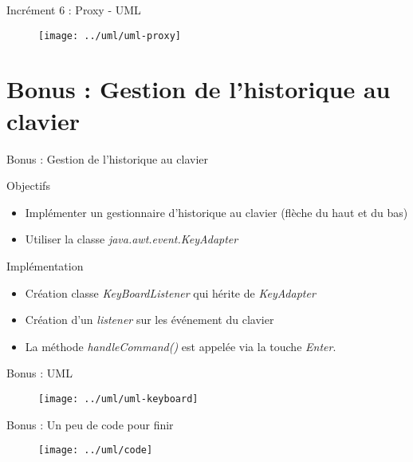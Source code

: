 \documentclass[utf8, 14pt]{beamer}
\begin{document}
	\begin{frame}{Incrément 6 : Proxy - UML}
		\begin{figure}[!h]
		\centering
		\texttt{[image: ../uml/uml-proxy]}
		\end{figure}		
	\end{frame}

	\section{Bonus : Gestion de l'historique au clavier}
	
	\begin{frame}{Bonus : Gestion de l'historique au clavier}
		\begin{block}{Objectifs}
		\begin{itemize}
		\item Implémenter un gestionnaire d’historique au clavier (flèche du haut et du bas)
		\item Utiliser la classe \emph{java.awt.event.KeyAdapter}
		\end{itemize}
		\end{block}
		
		\begin{exampleblock}{Implémentation}
		\begin{itemize}
		\item Création classe \emph{KeyBoardListener} qui hérite de \emph{KeyAdapter}
		\item Création d'un \emph{listener} sur les événement du clavier
		\item La méthode \emph{handleCommand()} est appelée via la touche \emph{Enter}.
		\end{itemize}
		\end{exampleblock}					
	\end{frame}

	\begin{frame}{Bonus : UML}
		\begin{figure}[!h]
		\centering
		\texttt{[image: ../uml/uml-keyboard]}
		\end{figure}		
	\end{frame}

	\begin{frame}{Bonus : Un peu de code pour finir}
		\begin{figure}[!h]
		\centering
		\texttt{[image: ../uml/code]}
		\end{figure}		
	\end{frame}
\end{document}
